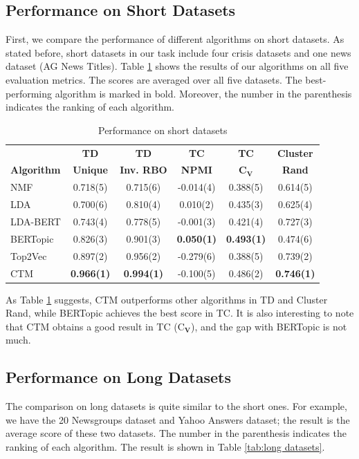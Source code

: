 \documentclass[11pt]{article}
\begin{document}
\subsection{Performance on Short Datasets}
First, we compare the performance of different algorithms on short datasets. As stated before, short datasets in our task include four crisis datasets and one news dataset (AG News Titles). Table \ref{tab:short datasets} shows the results of our algorithms on all five evaluation metrics. The scores are averaged over all five datasets. The best-performing algorithm is marked in bold. Moreover, the number in the parenthesis indicates the ranking of each algorithm.

\begin{table}[ht]
\centering
\begin{adjustbox}{width=0.5\textwidth}
\begin{tabular}{lccccc}
\hline
\textbf{} & \textbf{TD} & \textbf{TD} & \textbf{TC} & \textbf{TC} & \textbf{Cluster}\\
\textbf{Algorithm} & \textbf{Unique} & \textbf{Inv. RBO} & \textbf{NPMI} & \textbf{C${_\mathbf{V}}$} & \textbf{Rand}\\
\hline
NMF & 0.718(5) & 0.715(6) & -0.014(4) & 0.388(5) & 0.614(5)\\ 
LDA & 0.700(6) & 0.810(4) & 0.010(2) & 0.435(3) & 0.625(4)\\
LDA-BERT & 0.743(4) & 0.778(5) & -0.001(3) & 0.421(4) & 0.727(3)\\
BERTopic & 0.826(3) & 0.901(3) & \textbf{0.050(1)} & \textbf{0.493(1)} & 0.474(6)\\
Top2Vec & 0.897(2) & 0.956(2) & -0.279(6) & 0.388(5) & 0.739(2)\\
CTM & \textbf{0.966(1)} & \textbf{0.994(1)} & -0.100(5) & 0.486(2) & \textbf{0.746(1)}\\
\hline
\end{tabular}
\end{adjustbox}
\caption{Performance on short datasets}
\label{tab:short datasets}
\end{table}

As Table \ref{tab:short datasets} suggests, CTM outperforms other algorithms in TD and Cluster Rand, while BERTopic achieves the best score in TC. It is also interesting to note that CTM obtains a good result in TC (C${_\mathbf{V}}$), and the gap with BERTopic is not much.

\subsection{Performance on Long Datasets}
The comparison on long datasets is quite similar to the short ones. For example, we have the 20 Newsgroups dataset and Yahoo Answers dataset; the result is the average score of these two datasets. The number in the parenthesis indicates the ranking of each algorithm. The result is shown in Table \ref{tab:long datasets}.
\end{document}

